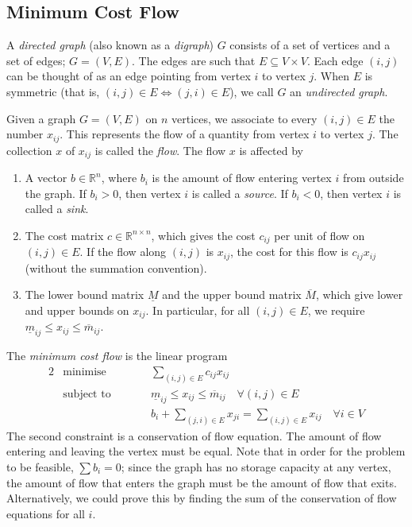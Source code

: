 \subsection{Minimum Cost Flow}
\begin{definition}
	A \textit{directed graph} (also known as a \textit{digraph}) \( G \) consists of a set of vertices and a set of edges; \( G = (V, E) \).
	The edges are such that \( E \subseteq V \times V \).
	Each edge \( (i,j) \) can be thought of as an edge pointing from vertex \( i \) to vertex \( j \).
	When \( E \) is symmetric (that is, \( (i,j) \in E \iff (j,i) \in E \)), we call \( G \) an \textit{undirected graph}.
\end{definition}
\begin{definition}
	Given a graph \( G = (V, E) \) on \( n \) vertices, we associate to every \( (i,j) \in E \) the number \( x_{ij} \).
	This represents the flow of a quantity from vertex \( i \) to vertex \( j \).
	The collection \( x \) of \( x_{ij} \) is called the \textit{flow}.
	The flow \( x \) is affected by
	\begin{enumerate}
		\item A vector \( b \in \mathbb R^n \), where \( b_i \) is the amount of flow entering vertex \( i \) from outside the graph.
		      If \( b_i > 0 \), then vertex \( i \) is called a \textit{source}.
		      If \( b_i < 0 \), then vertex \( i \) is called a \textit{sink}.
		\item The cost matrix \( c \in \mathbb R^{n \times n} \), which gives the cost \( c_{ij} \) per unit of flow on \( (i,j) \in E \).
		      If the flow along \( (i,j) \) is \( x_{ij} \), the cost for this flow is \( c_{ij}x_{ij} \) (without the summation convention).
		\item The lower bound matrix \( \underline{M} \) and the upper bound matrix \( \overline{M} \), which give lower and upper bounds on \( x_{ij} \).
		      In particular, for all \( (i,j) \in E \), we require \( \underline m_{ij} \leq x_{ij} \leq \overline m_{ij} \).
	\end{enumerate}
\end{definition}
\begin{definition}
	The \textit{minimum cost flow} is the linear program
	\begin{alignat*}{2}
		 & \text{minimise}   & \qquad & \sum_{(i,j) \in E}c_{ij}x_{ij}                                                   \\
		 & \text{subject to} &        & \underline m_{ij} \leq x_{ij} \leq \overline m_{ij} \quad \forall (i,j) \in E    \\
		 &                   &        & b_i + \sum_{(j,i) \in E} x_{ji} = \sum_{(i,j)\in E} x_{ij} \quad \forall i \in V
	\end{alignat*}
	The second constraint is a conservation of flow equation.
	The amount of flow entering and leaving the vertex must be equal.
	Note that in order for the problem to be feasible, \( \sum b_i = 0 \); since the graph has no storage capacity at any vertex, the amount of flow that enters the graph must be the amount of flow that exits.
	Alternatively, we could prove this by finding the sum of the conservation of flow equations for all \( i \).
\end{definition}
